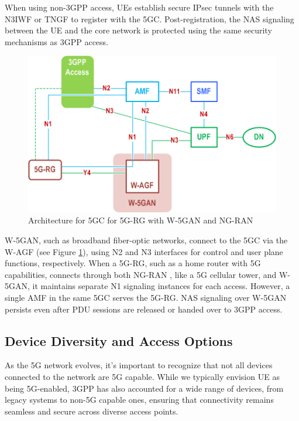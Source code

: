 When using non-\ac{3GPP} access, \ac{UE}s establish secure \ac{IPsec} tunnels with the \ac{N3IWF} or \ac{TNGF} to register with the \ac{5GC}. Post-registration, the \ac{NAS} signaling between the \ac{UE} and the core network is protected using the same security mechanisms as \ac{3GPP} access.

\begin{figure}
    \centering
    \includegraphics[width=0.5\linewidth]{figs/Architecture for 5G Core Network for 5G-RG with Wireline 5G Access network and NG RAN.png}
    \caption{Architecture for \acl{5GC} for \ac{5G-RG} with \acl{W-5GAN} and \ac{NG-RAN}}
    \label{fig:Architecture for 5G Core Network for 5G-RG with Wireline 5G Access network and NG RAN}
\end{figure}

\ac{W-5GAN}, such as broadband fiber-optic networks, connect to the \ac{5GC} via the \ac{W-AGF} (see Figure \ref{fig:Architecture for 5G Core Network for 5G-RG with Wireline 5G Access network and NG RAN}), using N2 and N3 interfaces for control and user plane functions, respectively. When a \ac{5G-RG}, such as a home router with \ac{5G} capabilities, connects through both \ac{NG-RAN} , like a \ac{5G} cellular tower, and \ac{W-5GAN}, it maintains separate N1 signaling instances for each access. However, a single \ac{AMF} in the same \ac{5GC} serves the \ac{5G-RG}. \ac{NAS} signaling over \ac{W-5GAN} persists even after \ac{PDU} sessions are released or handed over to \ac{3GPP} access.

\subsection{Device Diversity and Access Options}

As the \ac{5G} network evolves, it's important to recognize that not all devices connected to the network are \ac{5G} capable. While we typically envision \ac{UE} as being \ac{5G}-enabled, \ac{3GPP} has also accounted for a wide range of devices, from legacy systems to non-\ac{5G} capable ones, ensuring that connectivity remains seamless and secure across diverse access points.

